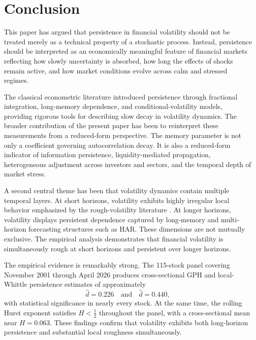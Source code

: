 \documentclass[unnumsec,webpdf,contemporary,large]{oup-authoring-template}%
\theoremstyle{thmstyleone}%
\theoremstyle{thmstyletwo}%
\theoremstyle{thmstylethree}%
\begin{document}
\section{Conclusion}
\label{sec:conclusion}

This paper has argued that persistence in financial volatility should not
be treated merely as a technical property of a stochastic process. Instead,
persistence should be interpreted as an economically meaningful feature of
financial markets reflecting how slowly uncertainty is absorbed, how long
the effects of shocks remain active, and how market conditions evolve
across calm and stressed regimes.

The classical econometric literature introduced persistence through
fractional integration, long-memory dependence, and conditional-volatility
models, providing rigorous tools for describing slow decay in volatility
dynamics. The broader contribution of the present paper has been to
reinterpret these measurements from a reduced-form perspective. The memory
parameter is not only a coefficient governing autocorrelation decay. It is
also a reduced-form indicator of information persistence, liquidity-mediated
propagation, heterogeneous adjustment across investors and sectors, and the
temporal depth of market stress.

A second central theme has been that volatility dynamics contain multiple
temporal layers. At short horizons, volatility exhibits highly irregular
local behavior emphasized by the rough-volatility literature
\citep{gatheral2018volatility}. At longer horizons, volatility displays
persistent dependence captured by long-memory and multi-horizon forecasting
structures such as HAR. These dimensions are not mutually exclusive. The
empirical analysis demonstrates that financial volatility is simultaneously
rough at short horizons and persistent over longer horizons.

The empirical evidence is remarkably strong. The 115-stock panel covering
November 2001 through April 2026 produces cross-sectional GPH and
local-Whittle persistence estimates of approximately
\begin{equation*}
   \hat{d} = 0.226 \quad \text{and} \quad  \hat{d} = 0.440,
\end{equation*}
with statistical significance in nearly every stock. At the same time, the
rolling Hurst exponent satisfies $H < \frac{1}{2}$ throughout the panel, with
a cross-sectional mean near $H = 0.063$. These findings confirm that
volatility exhibits both long-horizon persistence and substantial local
roughness simultaneously.
\end{document}
